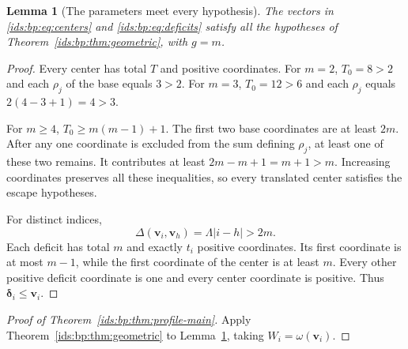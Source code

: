 \documentclass[11pt,letterpaper]{article}
\newtheorem{lemma}[theorem]{Lemma}
\theoremstyle{definition}\newtheorem{definition}[theorem]{Definition}
\theoremstyle{remark}\newtheorem{remark}[theorem]{Remark}
\theoremstyle{definition}\newtheorem{question}[theorem]{Question}
\newcommand{\bpgap}[1]{\omega(#1)}
\begin{document}
\begin{lemma}[The parameters meet every hypothesis]
\label{ids:bp:lem:parameters}
The vectors in \eqref{ids:bp:eq:centers} and \eqref{ids:bp:eq:deficits}
satisfy all the hypotheses of Theorem~\ref{ids:bp:thm:geometric}, with $g=m$.
\end{lemma}
\begin{proof}
Every center has total $T$ and positive coordinates. For $m=2$, $T_0=8>2$
and each $\rho_j$ of the base equals $3>2$. For $m=3$, $T_0=12>6$ and
each $\rho_j$ equals $2(4-3+1)=4>3$.

For $m\geq4$, $T_0\geq m(m-1)+1$. The first two base coordinates are
at least $2m$. After any one coordinate is excluded from the sum defining
$\rho_j$, at least one of these two remains. It contributes at least
$2m-m+1=m+1>m$. Increasing coordinates preserves all these inequalities,
so every translated center satisfies the escape hypotheses.

For distinct indices,
\[
 \Delta(\mathbf v_i,\mathbf v_h)=\Lambda|i-h|>2m.
\]
Each deficit has total $m$ and exactly $t_i$ positive coordinates. Its first
coordinate is at most $m-1$, while the first coordinate of the center is at
least $m$. Every other positive deficit coordinate is one and every center
coordinate is positive. Thus $\boldsymbol\delta_i\leq\mathbf v_i$.
\end{proof}

\begin{proof}[Proof of Theorem~\ref{ids:bp:thm:profile-main}]
Apply Theorem~\ref{ids:bp:thm:geometric} to
Lemma~\ref{ids:bp:lem:parameters}, taking $W_i=\bpgap{\mathbf v_i}$.
\end{proof}
\end{document}
